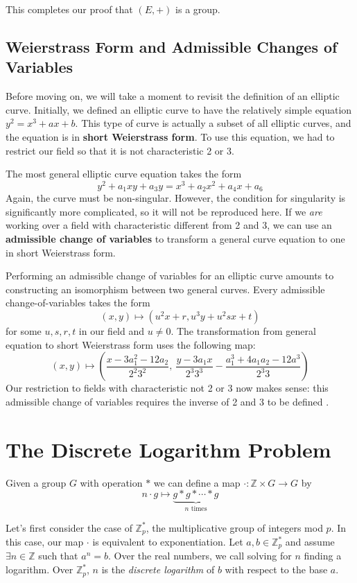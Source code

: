 \documentclass{article}
\begin{document}
This completes our proof that $(E,+)$ is a group.

\subsection{Weierstrass Form and Admissible Changes of Variables}
Before moving on, we will take a moment to revisit the definition of an elliptic curve.
Initially, we defined an elliptic curve to have the relatively simple equation $y^2 = x^3 + ax + b$.
This type of curve is actually a subset of all elliptic curves, and the equation is in \textbf{short Weierstrass form}.
To use this equation, we had to restrict our field so that it is not characteristic 2 or 3.

The most general elliptic curve equation takes the form
$$y^2 + a_1 xy + a_3 y = x^3 + a_2 x^2 + a_4 x + a_6$$
Again, the curve must be non-singular.
However, the condition for singularity is significantly more complicated, so it will not be reproduced here.
If we \emph{are} working over a field with characteristic different from 2 and 3, we can use an \textbf{admissible change of variables} to transform a general curve equation to one in short Weierstrass form.

Performing an admissible change of variables for an elliptic curve amounts to constructing an isomorphism between two general curves.
Every admissible change-of-variables takes the form
$$(x,y) \mapsto (u^2x + r, u^3y + u^2sx + t)$$
for some $u,s,r,t$ in our field and $u \neq 0$.
The transformation from general equation to short Weierstrass form uses the following map:
$$(x,y) \mapsto \left( \frac{x - 3a_1^2 - 12a_2}{2^2 3^2},~ \frac{y-3a_1x}{2^3 3^3} - \frac{a_1^3 + 4a_1a_2 - 12a^3}{2^3 3} \right)$$
Our restriction to fields with characteristic not 2 or 3 now makes sense: this admissible change of variables requires the inverse of 2 and 3 to be defined \cite[\S 3.1]{ecc-guide}.

\clearpage

\section{The Discrete Logarithm Problem}
Given a group $G$ with operation $*$ we can define a map $\cdot: \mathbb{Z} \times G \to G$ by
$$n\cdot g \mapsto \underbrace{g * g * \cdots * g}_{n\text{ times}}$$

Let's first consider the case of $\mathbb{Z}_p^*$, the multiplicative group of integers mod $p$.
In this case, our map $\cdot$ is equivalent to exponentiation.
Let $a,b \in \mathbb{Z}_p^*$ and assume $\exists n \in \mathbb{Z}$ such that $a^n = b$.
Over the real numbers, we call solving for $n$ finding a logarithm. Over $\mathbb{Z}_p^*$, $n$ is the \textit{discrete logarithm} of $b$ with respect to the base $a$.
\end{document}
